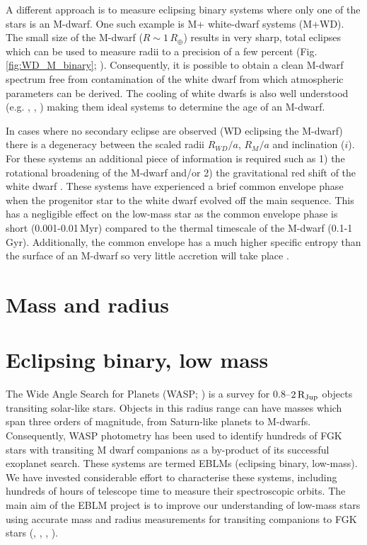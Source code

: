 A different approach is to measure eclipsing binary systems where only one of the stars is an M-dwarf. One such example is M+ white-dwarf systems (M+WD). The small size of the M-dwarf ($R \sim 1\,R_\oplus$) results in very sharp, total eclipses which can be used to measure radii to a precision of a few percent (Fig. \ref{fig:WD_M_binary}; \citealt{2010MNRAS.402.2591P}). Consequently, it is possible to obtain a clean M-dwarf spectrum free from contamination of the white dwarf from which atmospheric parameters can be derived. The cooling of white dwarfs is also well understood (e.g. \citealt{1997ApJ...486..413S}, \citealt{2013A&A...555A..96S}, \citealt{2014Natur.515...88V}) making them ideal systems to determine the age of an M-dwarf. 

In cases where no secondary eclipse are observed (WD eclipsing the M-dwarf) there is a degeneracy between the scaled radii $R_{WD}/a$, $R_{M}/a$ and inclination ($i$). For these systems an additional piece of information is required such as 1) the rotational broadening of the M-dwarf and/or 2) the gravitational red shift of the white dwarf \citep{2010MNRAS.402.2591P}.  These systems have experienced a brief common envelope phase when the progenitor star to the white dwarf evolved off the main sequence. This has a negligible effect on the low-mass star as the common envelope phase is short (0.001-0.01\,Myr) compared to the thermal timescale of the M-dwarf (0.1-1\,Gyr). Additionally, the common envelope has a much higher specific entropy than the surface of an M-dwarf so very little accretion will take place \citep{1991ApJ...370..709H}.
    
    


\section{Mass and radius}\label{mass_radius_section}



\section{Eclipsing binary, low mass}

The Wide Angle Search for Planets  (WASP; \citealt{2006PASP..118.1407P})  is a survey for $0.8$--$ 2 \rm \, R_{Jup}$ objects transiting solar-like stars. Objects in this radius range can have masses which span three orders of magnitude, from Saturn-like planets to M-dwarfs. Consequently, WASP photometry has been used to identify hundreds of FGK stars with transiting M dwarf companions as a by-product of its successful exoplanet search. These systems are termed EBLMs (eclipsing binary, low-mass). We have invested considerable effort to characterise these systems, including hundreds of hours of telescope time to measure their spectroscopic orbits. The main aim of the EBLM project is to improve our understanding of low-mass stars using accurate mass and radius measurements for transiting companions to FGK stars (\citealt{2013A&A...549A..18T}, \citealt{2014A&A...572A..50G}, \citealt{vonBoetticher2017}, \citealt{Triaud2017}).

